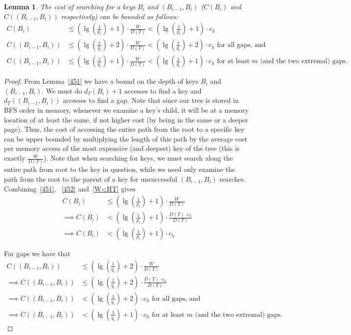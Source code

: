 \documentclass[letterpaper,12pt,titlepage,oneside,final]{book}
\theoremstyle{plain}
\newtheorem{lem}[thm]{Lemma}
\begin{document}
\begin{lem}
The cost of searching for a keys $B_i$ and $(B_{i-1},B_i)$ ($C(B_i)$ and $C((B_{i-1},B_i))$ respectively) can be bounded as follows: 
\begin{align*} 
C(B_i) &\leq (\lg(\frac{1}{p_i})+1)\cdot \frac{W}{D(T)} < (\lg(\frac{1}{p_i})+1)\cdot c_h \\
C((B_{i-1},B_i)) &\leq (\lg(\frac{1}{q_i})+2)\cdot \frac{W}{D(T)} < (\lg(\frac{1}{q_i})+2)\cdot c_h \text{ for all gaps, and} \\
C((B_{i-1},B_i)) &\leq (\lg(\frac{1}{q_i})+1)\cdot \frac{W}{D(T)} < (\lg(\frac{1}{q_i})+1)\cdot c_h \text{ for at least $m$ (and the two extremal) gaps}.
\end{align*}

\end{lem}

\begin{proof}
From Lemma~\ref{451} we have a bound on the depth of keys $B_i$ and $(B_{i-1},B_i)$. We must do $d_T(B_i) + 1$ accesses to find a key and $d_T((B_{i-1},B_i))$ accesses to find a gap. Note that since our tree is stored in BFS order in memory, whenever we examine a key's child, it will be at a memory location of at least the same, if not higher cost (by being in the same or a deeper page). Thus, the cost of accessing the entire path from the root to a specific key can be upper bounded by multiplying the length of this path by the average cost per memory access of the most expensive (and deepest) key of the tree (this is exactly $\frac{W}{D(T)}$). Note that when searching for keys, we must search along the entire path from root to the key in question, while we need only examine the path from the root to the parent of a key for unsuccessful $(B_{i-1},B_i)$ searches. Combining~\ref{451}, ~\ref{452} and~\ref{W<HT} gives
\begin{align*}
C(B_i) &\leq (\lg(\frac{1}{p_i})+1)\cdot\frac{W}{D(T)}\\
\implies C(B_i) &< (\lg(\frac{1}{p_i})+1)\cdot\frac{D(T)\cdot c_h}{D(T)}   \\
\implies C(B_i) &< (\lg(\frac{1}{p_i})+1)\cdot c_h
\end{align*}

For gaps we have that
\begin{align*}
C((B_{i-1},B_i)) &\leq (\lg(\frac{1}{q_i})+2)\cdot \frac{W}{D(T)}   \\
\implies C((B_{i-1},B_i)) &\leq (\lg(\frac{1}{q_i})+2)\cdot \frac{D(T)\cdot c_h}{D(T)}   \\
\implies C((B_{i-1},B_i)) &< (\lg(\frac{1}{q_i})+2)\cdot c_h \text{ for all gaps, and} \\
\implies C((B_{i-1},B_i)) &< (\lg(\frac{1}{q_i})+1)\cdot c_h \text{ for at least $m$ (and the two extremal) gaps}.
\end{align*}
\end{proof}
\end{document}
